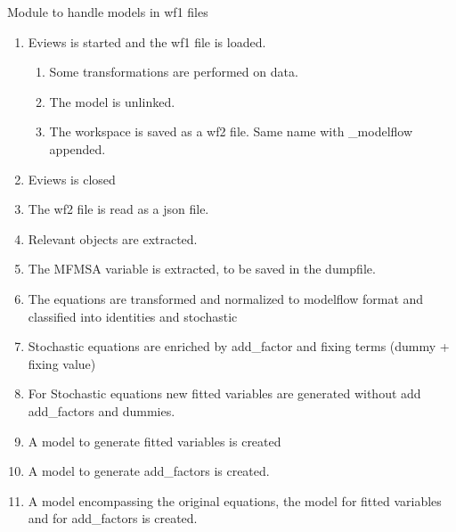 \documentclass[letterpaper,10pt,english]{sphinxmanual}
\begin{document}
\sphinxAtStartPar
Module to handle models in wf1 files
\begin{enumerate}
%
\item {} 
\sphinxAtStartPar
Eviews is started and the wf1 file is loaded.
\begin{enumerate}
%
\item {} 
\sphinxAtStartPar
Some transformations are performed on data.

\item {} 
\sphinxAtStartPar
The model is unlinked.

\item {} 
\sphinxAtStartPar
The workspace is saved as a wf2 file. Same name with \_modelflow appended.

\end{enumerate}

\item {} 
\sphinxAtStartPar
Eviews is closed

\item {} 
\sphinxAtStartPar
The wf2 file is read as a json file.

\item {} 
\sphinxAtStartPar
Relevant objects are extracted.

\item {} 
\sphinxAtStartPar
The MFMSA variable is  extracted, to be saved in the dumpfile.

\item {} 
\sphinxAtStartPar
The equations are transformed and normalized to modelflow format and classified into identities and stochastic

\item {} 
\sphinxAtStartPar
Stochastic equations are enriched by add\_factor and fixing terms (dummy + fixing value)

\item {} 
\sphinxAtStartPar
For Stochastic equations new fitted variables are generated \sphinxhyphen{} without add add\_factors and dummies.

\item {} 
\sphinxAtStartPar
A model to generate fitted variables is created

\item {} 
\sphinxAtStartPar
A model to generate add\_factors is created.

\item {} 
\sphinxAtStartPar
A model encompassing the original equations, the model for fitted variables and for add\_factors is created.


\end{enumerate}
\end{document}
